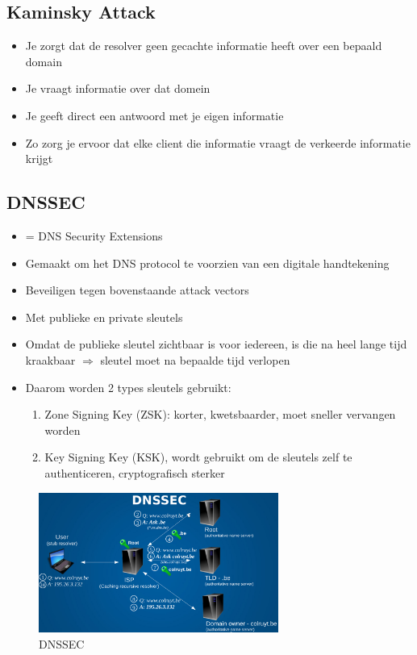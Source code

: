 \documentclass{article}
\begin{document}
\subsection{Kaminsky Attack}

\begin{itemize}
    \item Je zorgt dat de resolver geen gecachte informatie heeft over een bepaald domain
    \item Je vraagt informatie over dat domein
    \item Je geeft direct een antwoord met je eigen informatie
    \item Zo zorg je ervoor dat elke client die informatie vraagt de verkeerde informatie krijgt
\end{itemize}

\subsection{DNSSEC}

\begin{itemize}
    \item = DNS Security Extensions
    \item Gemaakt om het DNS protocol te voorzien van een digitale handtekening
    \item Beveiligen tegen bovenstaande attack vectors
    \item Met publieke en private sleutels
    \item Omdat de publieke sleutel zichtbaar is voor iedereen, is die na heel lange tijd kraakbaar $\Rightarrow$ sleutel moet na bepaalde tijd verlopen
    \item Daarom worden 2 types sleutels gebruikt:
    \begin{enumerate}
        \item Zone Signing Key (ZSK): korter, kwetsbaarder, moet sneller vervangen worden
        \item Key Signing Key (KSK), wordt gebruikt om de sleutels zelf te authenticeren, cryptografisch sterker
    \end{enumerate}
\end{itemize}

\begin{figure}[H]
    \centering
    \includegraphics[width=0.7\textwidth]{dnssec.png}
    \caption{DNSSEC}
\end{figure}
\end{document}

